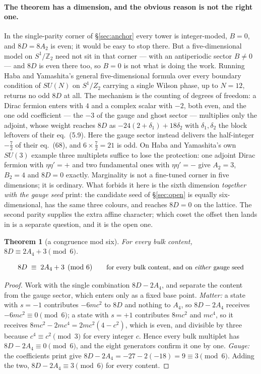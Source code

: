 \documentclass[11pt,a4paper]{article}
\newtheorem{theorem}{Theorem}
\newcommand{\ZZ}{\mathbb{Z}}
\newcommand{\su}[1]{SU(#1)}
\newenvironment{keyeq}
  {\begin{center}\setlength{\fboxsep}{9pt}\setlength{\fboxrule}{0.8pt}%
   \begin{lrbox}{\keyeqbox}\begin{minipage}{0.88\textwidth}}
  {\end{minipage}\end{lrbox}%
   \fcolorbox{hdrblue!55}{hdrblue!6}{\usebox{\keyeqbox}}\end{center}}
\begin{document}
\paragraph{The theorem has a dimension, and the obvious reason is not the right one.} In the
single-parity corner of \S\ref{sec:anchor} every tower is integer-moded, $B=0$, and $8D=8A_2$
is even; it would be easy to stop there. But a five-dimensional model on $S^1/\ZZ_2$ need not sit in
that corner --- with an antiperiodic sector $B\neq0$ --- and $8D$ is even there too, so
$B=0$ is not what is doing the work. Running Haba and
Yamashita's general five-dimensional formula \cite{HY04} over every boundary condition of
$\su{N}$ on $S^1/Z_2$ carrying a single Wilson phase, up to $N=12$, returns no odd $8D$ at all. The
mechanism is the counting of degrees of freedom: a Dirac fermion enters with $4$ and a complex
scalar with $-2$, both even, and the one odd coefficient --- the $-3$ of the gauge and ghost sector
--- multiplies only the adjoint, whose weight reaches $8D$ as $-24(2+\delta_1)+18\delta_2$ with
$\delta_1,\delta_2$ the block leftovers of their eq.~(5.9). Here the gauge sector instead delivers
the half-integer $-\tfrac72$ of their eq.~(68), and $6\times\tfrac72=21$ is odd. On Haba and
Yamashita's own $\su3$ example three multiplets suffice to lose the protection: one adjoint Dirac
fermion with $\eta\eta'=+$ and two fundamental ones with $\eta\eta'=-$ give $A_2=3$, $B_2=4$ and
$8D=0$ exactly. Marginality is not a fine-tuned corner in five dimensions; it is ordinary. What
forbids it here is the sixth dimension \emph{together with the gauge seed} \cite{KM25} print: the
candidate seed of \S\ref{sec:open} is equally six-dimensional, has the same three colours, and
reaches $8D=0$ on the lattice. The second parity supplies the extra affine character; which coset
the offset then lands in is a separate question, and it is the open one.

\begin{theorem}[a congruence mod six]\label{thm:mod6}
For every bulk content, $8D\equiv 2A_4+3 \pmod 6$.
\end{theorem}
\begin{keyeq}
\begin{equation}\label{eq:mod6law}
  8D\;\equiv\;2A_4+3 \pmod 6\qquad
  \text{\small for every bulk content, and on \emph{either} gauge seed}
\end{equation}
\end{keyeq}
\begin{proof}
Work with the single combination $8D-2A_4$, and separate the content from the gauge sector, which
enters only as a fixed base point. \emph{Matter:} a state with $s=-1$ contributes $-6mc^2$ to $8D$
and nothing to $A_4$, so $8D-2A_4$ receives $-6mc^2\equiv0\pmod6$; a state with $s=+1$ contributes
$8mc^2$ and $mc^4$, so it receives $8mc^2-2mc^4=2mc^2(4-c^2)$, which is even, and divisible by
three because $c^4\equiv c^2\pmod3$ for every integer $c$. Hence every bulk multiplet has
$8D-2A_4\equiv0\pmod 6$, and the eight generators confirm it one by one.
\emph{Gauge:} the coefficients \cite{KM25} print give $8D-2A_4=-27-2(-18)=9\equiv3\pmod6$. Adding
the two, $8D-2A_4\equiv3\pmod 6$ for every content.
\end{proof}
\end{document}

